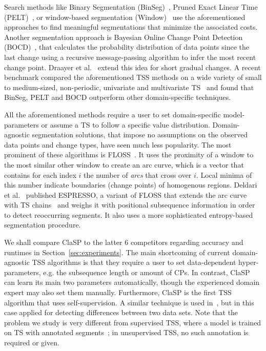 \documentclass[pdflatex,sn-basic]{sn-jnl}
\begin{document}
Search methods like Binary Segmentation (BinSeg)~\citep{Sen1975OnTF}, Pruned Exact Linear Time (PELT)~\citep{Killick2012OptimalDO}, or window-based segmentation (Window)~\citep{truong2020selective} use the aforementioned approaches to find meaningful segmentations that minimize the associated costs. Another segmentation approach is Bayesian Online Change Point Detection (BOCD)~\citep{adams2007bayesian}, that calculates the probability distribution of data points since the last change using a recursive message-passing algorithm to infer the most recent change point. Draayer et al.~\citep{Draayer2021ReevaluatingTC} extend this idea for short gradual changes. A recent benchmark compared the aforementioned TSS methods on a wide variety of small to medium-sized, non-periodic, univariate and multivariate TS~\citep{van2020evaluation} and found that BinSeg, PELT and BOCD outperform other domain-specific techniques. 

All the aforementioned methods require a user to set domain-specific model-parameters or assume a TS to follow a specific value distribution. Domain-agnostic segmentation solutions, that impose no assumptions on the observed data points and change types, have seen much less popularity. The most prominent of these algorithms is FLOSS~\citep{gharghabi2017matrix,Gharghabi2018DomainAO}. It uses the proximity of a window to the most similar other window to create an arc curve, which is a vector that contains for each index $i$ the number of \emph{arcs} that cross over $i$. Local minima of this number indicate boundaries (change points) of homogenous regions. Deldari et al.~\citep{Deldari2020ESPRESSOEA} published ESPRESSO, a variant of FLOSS that extends the arc curve with TS chains~\citep{Zhu2017MatrixPV} and weighs it with positional subsequence information in order to detect reoccurring segments. It also uses a more sophisticated entropy-based segmentation procedure. 

We shall compare ClaSP to the latter $6$ competitors regarding accuracy and runtimes in Section~\ref{sec:experiments}. The main shortcoming of current domain-agnostic TSS algorithms is that they require a user to set data-dependent hyper-parameters, e.g. the subsequence length or amount of CPs. In contrast, ClaSP can learn its main two parameters automatically, though the experienced domain expert may also set them manually. Furthermore, ClaSP is the first TSS algorithm that uses self-supervision. A similar technique is used in~\citep{hido2008unsupervised}, but in this case applied for detecting differences between two data sets. Note that the problem we study is very different from supervised TSS, where a model is trained on TS with annotated segments~\citep{cook2015activity}; in unsupervised TSS, no such annotation is required or given. 
\end{document}
